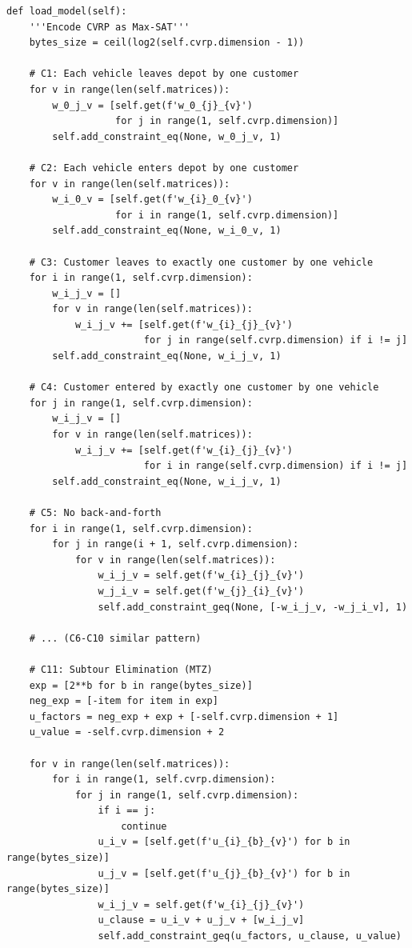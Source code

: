\documentclass[12pt,a4paper]{article}
\theoremstyle{definition}
\begin{document}
\begin{lstlisting}[caption={Loading Model Constraints}]
def load_model(self):
    '''Encode CVRP as Max-SAT'''
    bytes_size = ceil(log2(self.cvrp.dimension - 1))
    
    # C1: Each vehicle leaves depot by one customer
    for v in range(len(self.matrices)):
        w_0_j_v = [self.get(f'w_0_{j}_{v}') 
                   for j in range(1, self.cvrp.dimension)]
        self.add_constraint_eq(None, w_0_j_v, 1)
    
    # C2: Each vehicle enters depot by one customer
    for v in range(len(self.matrices)):
        w_i_0_v = [self.get(f'w_{i}_0_{v}') 
                   for i in range(1, self.cvrp.dimension)]
        self.add_constraint_eq(None, w_i_0_v, 1)
    
    # C3: Customer leaves to exactly one customer by one vehicle
    for i in range(1, self.cvrp.dimension):
        w_i_j_v = []
        for v in range(len(self.matrices)):
            w_i_j_v += [self.get(f'w_{i}_{j}_{v}') 
                        for j in range(self.cvrp.dimension) if i != j]
        self.add_constraint_eq(None, w_i_j_v, 1)
    
    # C4: Customer entered by exactly one customer by one vehicle
    for j in range(1, self.cvrp.dimension):
        w_i_j_v = []
        for v in range(len(self.matrices)):
            w_i_j_v += [self.get(f'w_{i}_{j}_{v}') 
                        for i in range(self.cvrp.dimension) if i != j]
        self.add_constraint_eq(None, w_i_j_v, 1)
    
    # C5: No back-and-forth
    for i in range(1, self.cvrp.dimension):
        for j in range(i + 1, self.cvrp.dimension):
            for v in range(len(self.matrices)):
                w_i_j_v = self.get(f'w_{i}_{j}_{v}')
                w_j_i_v = self.get(f'w_{j}_{i}_{v}')
                self.add_constraint_geq(None, [-w_i_j_v, -w_j_i_v], 1)
    
    # ... (C6-C10 similar pattern)
    
    # C11: Subtour Elimination (MTZ)
    exp = [2**b for b in range(bytes_size)]
    neg_exp = [-item for item in exp]
    u_factors = neg_exp + exp + [-self.cvrp.dimension + 1]
    u_value = -self.cvrp.dimension + 2
    
    for v in range(len(self.matrices)):
        for i in range(1, self.cvrp.dimension):
            for j in range(1, self.cvrp.dimension):
                if i == j:
                    continue
                u_i_v = [self.get(f'u_{i}_{b}_{v}') for b in range(bytes_size)]
                u_j_v = [self.get(f'u_{j}_{b}_{v}') for b in range(bytes_size)]
                w_i_j_v = self.get(f'w_{i}_{j}_{v}')
                u_clause = u_i_v + u_j_v + [w_i_j_v]
                self.add_constraint_geq(u_factors, u_clause, u_value)
    

\end{lstlisting}
\end{document}
